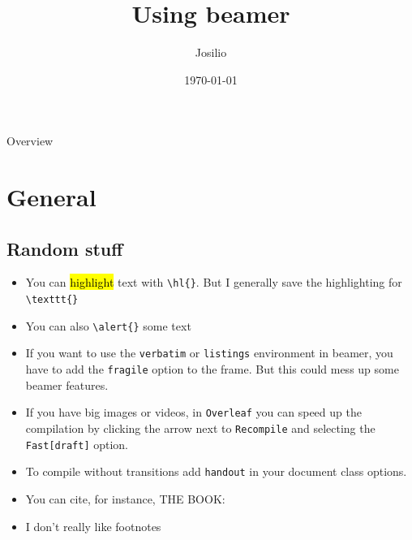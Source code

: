 \documentclass[aspectratio=169,11pt]{beamer}
\title[beamer stuff]{Using beamer}
\author{Josilio}
\date{\today}
\institute{KTH Mechanics}
\begin{document}
\startpagenew
\begin{frame}[noframenumbering]

  \maketitle

\end{frame}


\normalpageline


\begin{frame}{Overview}
\tableofcontents
\end{frame}

\section{General}
\subsection{Random stuff}
\begin{frame}[fragile]{\insertsection}
    \begin{itemize}
    \item You can \hl{highlight} text with \verb|\hl{}|. But I generally save the highlighting for \verb|\texttt{}|
    \item You can also \verb|\alert{}| some \alert{text}
    \item If you want to use the \texttt{verbatim} or \texttt{listings} environment in beamer, you have to add the \texttt{fragile} option to the frame. But this could mess up some beamer features.
    \item If you have big images or videos, in \texttt{Overleaf} you can speed up the compilation by clicking the arrow next to \texttt{Recompile} and selecting the \texttt{Fast[draft]} option. 
    \item To compile without transitions add \texttt{handout} in your document class options.
    \item You can cite, for instance, THE BOOK: \cite{schmid2002stability}

    \item I don't really like footnotes\footnotemark[1]
    
    \end{itemize}
\end{frame}
\end{document}

